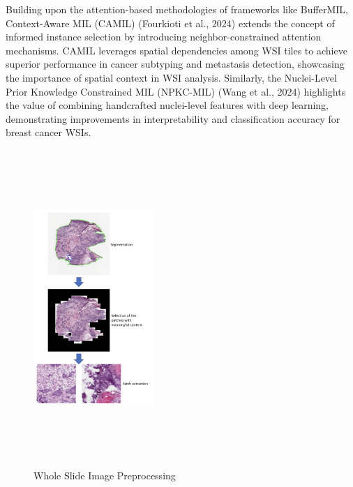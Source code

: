 \documentclass[10pt,twocolumn]{article}
\begin{document}
Building upon the attention-based methodologies of frameworks like BufferMIL, Context-Aware MIL (CAMIL) (Fourkioti et al., 2024)\cite{fourkioti2023camil} extends the concept of informed instance selection by introducing neighbor-constrained attention mechanisms. CAMIL leverages spatial dependencies among WSI tiles to achieve superior performance in cancer subtyping and metastasis detection, showcasing the importance of spatial context in WSI analysis. Similarly, the Nuclei-Level Prior Knowledge Constrained MIL (NPKC-MIL) (Wang et al., 2024)\cite{WANG2024109826} highlights the value of combining handcrafted nuclei-level features with deep learning, demonstrating improvements in interpretability and classification accuracy for breast cancer WSIs.



\begin{figure}[!htb]
\centering
\includegraphics[width=0.4\textwidth, height=12cm]{images/wsi_preprocess.png}
\caption{Whole Slide Image Preprocessing} 
\label{wsi_preprocessing}
\end{figure}
\end{document}
